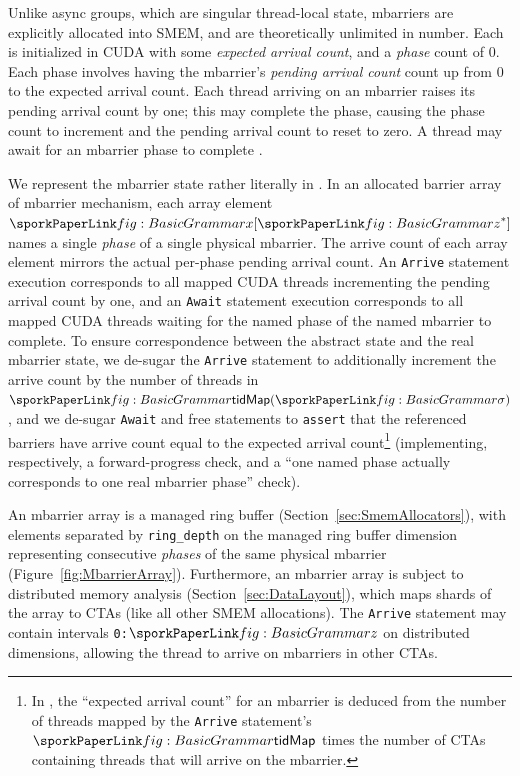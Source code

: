 
Unlike async groups, which are singular thread-local state,
mbarriers are explicitly allocated into SMEM,
and are theoretically unlimited in number.
Each is initialized in CUDA with some \emph{expected arrival count}, and a \emph{phase} count of 0.
Each phase involves having the mbarrier's \emph{pending arrival count} count up from 0 to the expected arrival count.
Each thread arriving on an mbarrier raises its pending arrival count by one;
this may complete the phase,
causing the phase count to increment and the pending arrival count to reset to zero.
A thread may await for an mbarrier phase to complete \cite{ptx}.

We represent the mbarrier state rather literally in \sporkName{}.
In an allocated barrier array of mbarrier mechanism,
each array element $\sporkx[\sporkz^*]$ names a single \emph{phase} of a single physical mbarrier.
The arrive count of each array element mirrors the actual per-phase pending arrival count.
An \sporkName{} \texttt{Arrive} statement execution corresponds to all mapped CUDA threads
incrementing the pending arrival count by one,
and an \texttt{Await} statement execution corresponds to all mapped CUDA threads waiting for
the named phase of the named mbarrier to complete.
To ensure correspondence between the abstract \sporkName{} state and the real mbarrier state,
we de-sugar the \texttt{Arrive} statement to additionally increment the \sporkName{} arrive count
by the number of threads in $\sporktidMap(\sporksigma)$,
and we de-sugar \texttt{Await} and free statements to \texttt{assert} that the referenced
barriers have \sporkName{} arrive count equal to the expected arrival count\footnote{%
In \sporkName{}, the ``expected arrival count'' for an mbarrier is deduced from
the number of threads mapped by the \texttt{Arrive} statement's $\sporktidMap$
times the number of CTAs containing threads that will arrive on the mbarrier. %
} (implementing, respectively, a forward-progress check, and a
``one named phase actually corresponds to one real mbarrier phase'' check).

An \sporkName{} mbarrier array is a managed ring buffer (Section~\ref{sec:SmemAllocators}),
with elements separated by \texttt{ring\_depth} on the managed ring buffer dimension
representing consecutive \emph{phases} of the same physical mbarrier (Figure~\ref{fig:MbarrierArray}).
Furthermore, an \sporkName{} mbarrier array is subject to distributed memory analysis
(Section~\ref{sec:DataLayout}),
which maps shards of the array to CTAs (like all other SMEM allocations).
The \texttt{Arrive} statement may contain intervals \texttt{0:$\sporkz$} on distributed dimensions,
allowing the thread to arrive on mbarriers in other CTAs.

